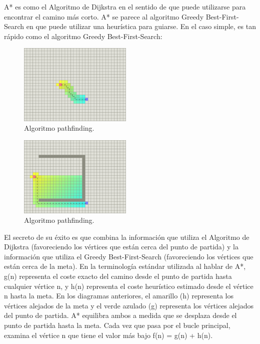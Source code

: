 \documentclass[reprint,amsmath,amssymb,aps]{revtex4-2}
\begin{document}
A* es como el Algoritmo de Dijkstra en el sentido de que puede utilizarse para encontrar el camino más corto. A* se parece al algoritmo Greedy Best-First-Search en que puede utilizar una heurística para guiarse. En el caso simple, es tan rápido como el algoritmo Greedy Best-First-Search:

\begin{figure}[H]
	\centering
	\includegraphics[width=0.48\textwidth]{a-star.png}
	\caption{Algoritmo pathfinding.}
	\label{a-trap}
\end{figure}

\begin{figure}[H]
	\centering
	\includegraphics[width=0.48\textwidth]{a-star-trap.png}
	\caption{Algoritmo pathfinding.}
	\label{a-trap}
\end{figure}

El secreto de su éxito es que combina la información que utiliza el Algoritmo de Dijkstra (favoreciendo los vértices que están cerca del punto de partida) y la información que utiliza el Greedy Best-First-Search (favoreciendo los vértices que están cerca de la meta). En la terminología estándar utilizada al hablar de A*, g(n) representa el coste exacto del camino desde el punto de partida hasta cualquier vértice n, y h(n) representa el coste heurístico estimado desde el vértice n hasta la meta. En los diagramas anteriores, el amarillo (h) representa los vértices alejados de la meta y el verde azulado (g) representa los vértices alejados del punto de partida. A* equilibra ambos a medida que se desplaza desde el punto de partida hasta la meta. Cada vez que pasa por el bucle principal, examina el vértice n que tiene el valor más bajo f(n) = g(n) + h(n).
\end{document}

